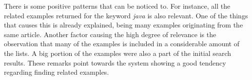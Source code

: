 There is some positive patterns that can be noticed to. For instance, all the related examples returned for the keyword \textit{java} is also relevant. One of the things that causes this is already explained, being many examples originating from the same article. Another factor causing the high degree of relevance is the observation that many of the examples is included in a considerable amount of the lists. A big portion of the examples were also a part of the initial search results. These remarks point towards the system showing a good tendency regarding finding related examples.


\cleardoublepage